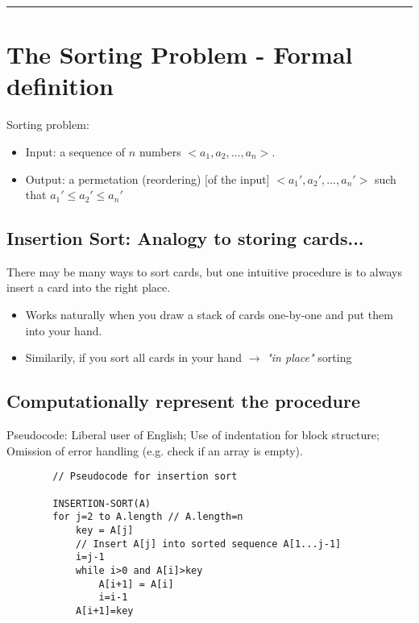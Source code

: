 \documentclass{article}
\title{\titleText}
\date{\today}
\author{John J Li}
\begin{document}
    \maketitle
    \thispagestyle{empty}
    \noindent\rule{\textwidth}{0.8pt}

    \section*{The Sorting Problem - Formal definition}

    Sorting problem:
    \begin{itemize}
        \item 
        Input: a sequence of $n$ numbers $<a_1,a_2,...,a_n>$.
        \item
        Output: a permetation (reordering) [of the input] $<a_1',a_2',...,a_n'>$
        such that $a_1'\leq a_2' \leq a_n'$
    \end{itemize}

    \subsection*{Insertion Sort: Analogy to storing cards...}

    There may be many ways to sort cards, but one intuitive procedure is to 
    always insert a card into the right place.
    \begin{itemize}
        \item Works naturally when you draw a stack of cards one-by-one and put them into 
        your hand.
        \item Similarily, if you sort all cards in your hand $\rightarrow$ \emph{"in place"} 
        sorting
    \end{itemize}

    \subsection*{Computationally represent the procedure}

    Pseudocode: Liberal user of English; Use of indentation for block structure; Omission
    of error handling (e.g. check if an array is empty).

    \begin{lstlisting}
        // Pseudocode for insertion sort 

        INSERTION-SORT(A)
        for j=2 to A.length // A.length=n
            key = A[j]
            // Insert A[j] into sorted sequence A[1...j-1]
            i=j-1
            while i>0 and A[i]>key
                A[i+1] = A[i]
                i=i-1
            A[i+1]=key
    \end{lstlisting}
\end{document}
